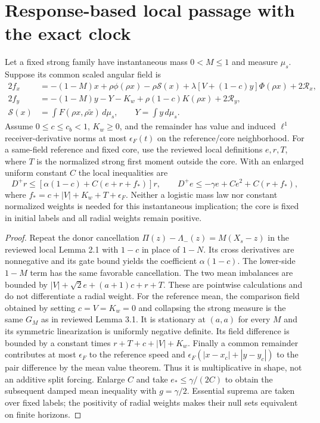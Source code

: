 \documentclass[11pt]{article}
\numberwithin{equation}{section}
\theoremstyle{remark}\newtheorem{remark}[theorem]{Remark}
\newcommand{\dd}{\,d}\newcommand{\E}{\mathbb E}\newcommand{\R}{\mathbb R}
\begin{document}
\section{Response-based local passage with the exact clock}
\begin{proposition}\label{inc:AN03:clock:v1:cfield}
Let a fixed strong family have instantaneous mass $0<M\le1$ and measure $\mu_s$. Suppose its common scaled angular field is
\begin{align*}
 2f_x&=-(1-M)x+\rho\phi(\rho x)-\rho\mathcal S(x)
             +\lambda[V+(1-c)y]\Phi(\rho x)+2\mathcal R_x,\\
 2f_y&=-(1-M)y-Y-K_w+\rho(1-c)K(\rho x)+2\mathcal R_y,\\
 \mathcal S(x)&=\int F(\rho x,\rho\widetilde x)\dd\mu_s,\qquad Y=\int y\dd\mu_s.
\end{align*}
Assume $0\le c\le c_b<1$, $K_w\ge0$, and the remainder has value and induced $\ell^1$ receiver-derivative norms at most $\epsilon_F(t)$ on the reference/core neighborhood. For a same-field reference and fixed core, use the reviewed local definitions $e,r,T$, where $T$ is the normalized strong first moment outside the core. With an enlarged uniform constant $C$ the local inequalities are
\[
 D^+r\le[\alpha(1-c)+C(e+r+f_*)]r,\qquad
 D^+e\le-\gamma e+Ce^2+C(r+f_*),
\]
where $f_*=c+|V|+K_w+T+\epsilon_F$. Neither a logistic mass law nor constant normalized weights is needed for this instantaneous implication; the core is fixed in initial labels and all radial weights remain positive.
\end{proposition}
\begin{proof}
Repeat the donor cancellation $\Pi(z)-\Lambda_-(z)=M(X_s-z)$ in the reviewed local Lemma 2.1 with $1-c$ in place of $1-N$. Its cross derivatives are nonnegative and its gate bound yields the coefficient $\alpha(1-c)$. The lower-side $1-M$ term has the same favorable cancellation. The two mean imbalances are bounded by $|V|+\sqrt2e+(a+1)c+r+T$. These are pointwise calculations and do not differentiate a radial weight.
For the reference mean, the comparison field obtained by setting $c=V=K_w=0$ and collapsing the strong measure is the same $G_M$ as in reviewed Lemma 3.1. It is stationary at $(a,a)$ for every $M$ and its symmetric linearization is uniformly negative definite. Its field difference is bounded by a constant times $r+T+c+|V|+K_w$.
Finally a common remainder contributes at most $\epsilon_F$ to the reference speed and $\epsilon_F(|x-x_c|+|y-y_c|)$ to the pair difference by the mean value theorem. Thus it is multiplicative in shape, not an additive split forcing. Enlarge $C$ and take $e_*\le\gamma/(2C)$ to obtain the subsequent damped mean inequality with $g=\gamma/2$. Essential suprema are taken over fixed labels; the positivity of radial weights makes their null sets equivalent on finite horizons.
\end{proof}
\end{document}
